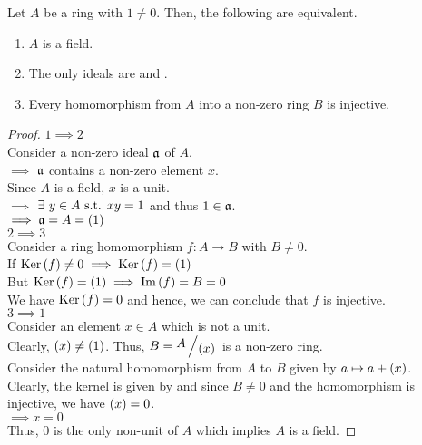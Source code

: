 \begin{proposition}{}{}
	Let \( A \) be a ring with \( 1 \neq 0 \).
	Then, the following are equivalent.
	\begin{enumerate}
		\item \( A \) is a field.
		\item The only ideals are  and .
		\item Every homomorphism from \( A \) into a non-zero ring
		\( B \) is injective.
	\end{enumerate}
\end{proposition}
\begin{proof}
	\( 1 \implies 2 \) \\
	Consider a non-zero ideal \( \mathfrak{a} \) of \( A \). \\
	\( \implies \) \( \mathfrak{a} \) contains a non-zero element \( x \). \\
	Since \( A \) is a field, \( x \) is a unit. \\
	\( \implies \) \( \exists\ y \in A \text{ s.t. } xy = 1 \)
		and thus \( 1 \in \mathfrak{a} \). \\
	\( \implies \mathfrak{a} = A = (1) \) \\

	\( 2 \implies 3 \) \\
	Consider a ring homomorphism \( f: A \to B \) with \( B \neq 0 \). \\
	If \( \operatorname{Ker}\left( f \right) \neq 0 \implies \operatorname{Ker}\left( f \right) = \left( 1 \right) \) \\
	But \( \operatorname{Ker}\left( f \right) = \left( 1 \right) \implies \operatorname{Im}\left( f \right) = B = 0 \) \\
	We have \( \operatorname{Ker}\left( f \right) = 0 \) and hence, we can conclude that
	\( f \) is injective. \\

	\( 3 \implies 1 \) \\
	Consider an element \( x \in A \) which is not a unit. \\
	Clearly, \( \left( x \right) \neq \left( 1 \right) \).
	Thus, \( B = \bigslant{A}{\brak{x}} \) is a non-zero ring. \\
	Consider the natural homomorphism from \( A \) to \( B \) given by
	\( a \mapsto a + \left( x \right) \). \\
	Clearly, the kernel is given by  and since \( B \neq 0 \)
	and the homomorphism is injective, we have \( \left( x \right) = 0 \). \\
	\( \implies x = 0 \) \\
	Thus, 0 is the only non-unit of \( A \) which implies \( A \)
	is a field.
\end{proof}



